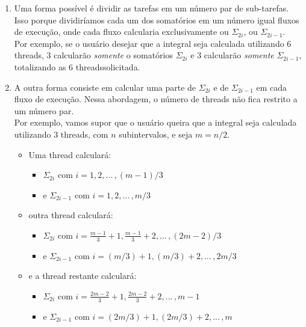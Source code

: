 \documentclass{article}
\begin{document}
\begin{enumerate}
    \item  Uma forma possível é dividir as tarefas em um número
    par de sub-tarefas. Isso porque dividiríamos cada
    um dos somatórios em um número igual fluxos de execução, onde
    cada fluxo calcularia exclusivamente ou $\Sigma_{2i}$, ou
    $\Sigma_{2i-1}$.\\
    Por exemplo, se o usuário desejar que a integral seja calculada
    utilizando $6$ threads, $3$ calcularão \emph{somente} o
    somatórios $\Sigma_{2i}$ e $3$ calcularão \emph{somente}
    $\Sigma_{2i-1}$, totalizando as $6$ threadssolicitada.
    \item  A outra forma consiste em calcular uma parte de
    $\Sigma_{2i}$ e de $\Sigma_{2i-1}$ em cada fluxo de
    execução. Nessa abordagem, o número de threads não fica
    restrito a um número par.\\
    Por exemplo, vamos supor que o usuário queira que a integral
    seja calculada utilizando $3$ threads, com $n$ subintervalos,
    e seja $m = n/2$.\\
    \begin{itemize}
        \item Uma thread calculará:
        \begin{itemize}
            \item $\Sigma_{2i}$ com $i=1,2,...\,,(m-1)/3$
            \item e $\Sigma_{2i-1}$ com $i=1,2,...\,,m/3$
        \end{itemize} 
        \item outra thread calculará:
        \begin{itemize}
            \item $\Sigma_{2i}$ com $i=\frac{m-1}{3}+1,\frac{m-1}{3}+2,...\,,(2m-2)/3$
            \item  e $\Sigma_{2i-1}$ com $i=(m/3)+1,(m/3)+2,...\,,2m/3$
        \end{itemize}
        \item e a thread restante calculará:
        \begin{itemize}
            \item $\Sigma_{2i}$ com $i=\frac{2m-2}{3}+1,\frac{2m-2}{3}+2,...\,,m-1$
            \item  e $\Sigma_{2i-1}$ com $i=(2m/3)+1,(2m/3)+2,...\,,m$
        \end{itemize}
    \end{itemize}
\end{enumerate}
\end{document}
